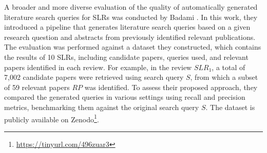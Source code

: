 A broader and more diverse evaluation of the quality of automatically generated literature search queries for SLRs was conducted by Badami \autocite{badami2023adaptive}. In this work, they introduced a pipeline that generates literature search queries based on a given research question and abstracts from previously identified relevant publications. The evaluation was performed against a dataset they constructed, which contains the results of 10 SLRs, including candidate papers, queries used, and relevant papers identified in each review. For example, in the review $SLR_1$, a total of 7,002 candidate papers were retrieved using search query $S$, from which a subset of 59 relevant papers $RP$ was identified. To assess their proposed approach, they compared the generated queries in various settings using recall and precision metrics, benchmarking them against the original search query $S$. The dataset is publicly available on Zenodo\footnote{\url{https://tinyurl.com/496zuar3}}.

